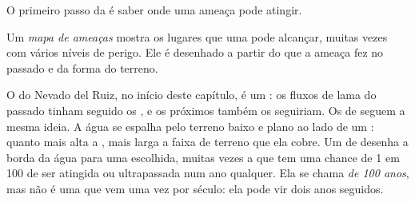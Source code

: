 O primeiro passo da  é saber onde uma ameaça pode atingir.

\begin{definition}\label{def:g9:natural-risks:hazard-map}
Um \emph{mapa de ameaças} mostra
os lugares que uma  pode alcançar, muitas vezes com vários
níveis de perigo. Ele é desenhado a partir do que a ameaça fez no passado
e da forma do terreno.
\end{definition}

O  do Nevado del Ruiz, no início deste capítulo, é um : os fluxos de lama do passado tinham seguido os , e os
próximos também os seguiriam. Os  de  seguem a mesma ideia.
A água se espalha pelo terreno baixo e plano ao lado de um : quanto
mais alta a , mais larga a faixa de terreno que ela cobre. Um
 de  desenha a borda da água para uma  escolhida,
muitas vezes a  que tem uma chance de 1 em 100 de ser atingida
ou ultrapassada num ano qualquer. Ela se chama \emph{ de 100
anos}, mas não é uma  que vem uma vez por século: ela pode vir
dois anos seguidos.

